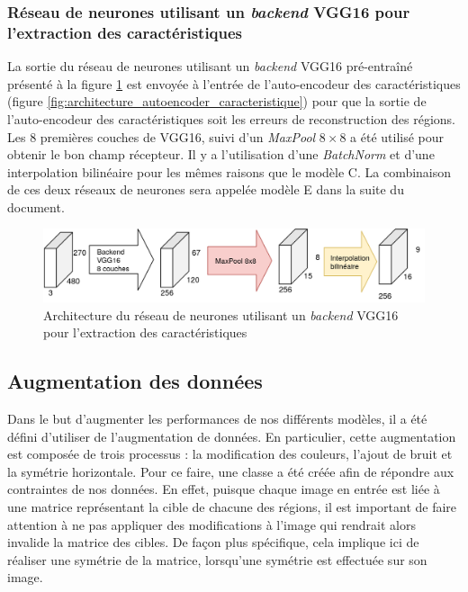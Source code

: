 \subsubsection{Réseau de neurones utilisant un \textit{backend} VGG16 pour l'extraction des caractéristiques}
    La sortie du réseau de neurones utilisant un \textit{backend} VGG16 pré-entraîné présenté à la figure \ref{fig:architecture_vgg16} est envoyée à l'entrée de l'auto-encodeur des caractéristiques (figure \ref{fig:architecture_autoencoder_caracteristique}) pour que la sortie de l'auto-encodeur des caractéristiques soit les erreurs de reconstruction des régions. Les 8 premières couches de VGG16, suivi d'un \textit{MaxPool} \(8\times8\) a été utilisé pour obtenir le bon champ récepteur. Il y a l'utilisation d'une \textit{BatchNorm} et d'une interpolation bilinéaire pour les mêmes raisons que le modèle C. La combinaison de ces deux réseaux de neurones sera appelée modèle E dans la suite du document.
    \begin{figure}
        \centering
        \includegraphics[width=15cm]{images/Architecture_Vgg16BackendAutoencoder.png}
        \caption{Architecture du réseau de neurones utilisant un \textit{backend} VGG16 pour l'extraction des caractéristiques}
        \label{fig:architecture_vgg16}
    \end{figure}

\subsection{Augmentation des données}
    Dans le but d'augmenter les performances de nos différents modèles, il a été défini d'utiliser de l'augmentation de données. En particulier, cette augmentation est composée de trois processus : la modification des couleurs, l'ajout de bruit et la symétrie horizontale. Pour ce faire, une classe a été créée afin de répondre aux contraintes de nos données. En effet, puisque chaque image en entrée est liée à une matrice représentant la cible de chacune des régions, il est important de faire attention à ne pas appliquer des modifications à l'image qui rendrait alors invalide la matrice des cibles. De façon plus spécifique, cela implique ici de réaliser une symétrie de la matrice, lorsqu'une symétrie est effectuée sur son image.
    \bigskip
    

